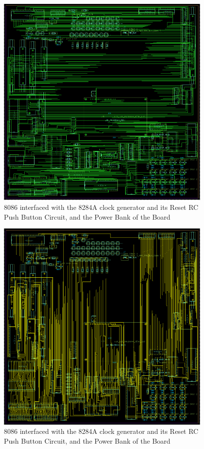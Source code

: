         \begin{figure}[ht]
            \begin{center}
                \includegraphics[width=0.95\textwidth]{figures/top.png}
                \caption{8086 interfaced with the 8284A clock generator and its Reset RC Push Button Circuit, and the Power Bank of the Board} \label{fig:top}
            \end{center}
        \end{figure}

        \begin{figure}[ht]
            \begin{center}
                \includegraphics[width=0.95\textwidth]{figures/bottom.png}
                \caption{8086 interfaced with the 8284A clock generator and its Reset RC Push Button Circuit, and the Power Bank of the Board} \label{fig:bottom}
            \end{center}
        \end{figure}

